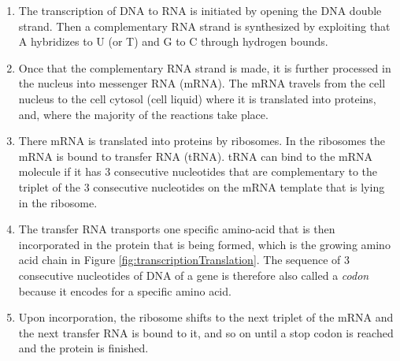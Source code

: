 \documentclass[
  11pt,
]{book}
\begin{document}
\begin{enumerate}
\def\labelenumi{\arabic{enumi}.}
\item
  The transcription of DNA to RNA is initiated by opening the
  DNA double strand. Then a complementary RNA strand is synthesized by exploiting that A hybridizes to U (or T) and G to C through hydrogen bounds.
\item
  Once that the complementary RNA strand is made, it is further processed in the nucleus into messenger RNA (mRNA). The mRNA travels from the cell nucleus to the cell cytosol (cell liquid) where it is translated into proteins, and, where the majority of the reactions take place.
\item
  There mRNA is translated into proteins by ribosomes.
  In the ribosomes the mRNA is bound to transfer RNA (tRNA). tRNA can bind to the mRNA molecule if it has 3 consecutive nucleotides that are complementary to the triplet of the 3 consecutive nucleotides on the mRNA template that is lying in the ribosome.
\item
  The transfer RNA transports one specific amino-acid that is then incorporated in the protein that is being formed, which is the growing amino acid chain in Figure \ref{fig:transcriptionTranslation}. The sequence of 3 consecutive nucleotides of DNA of a gene is therefore also called a \emph{codon} because it encodes for a specific amino acid.
\item
  Upon incorporation, the ribosome shifts to the next triplet of the mRNA and the next transfer RNA is bound to it, and so on until a stop codon is reached and the protein is finished.
\end{enumerate}
\end{document}
